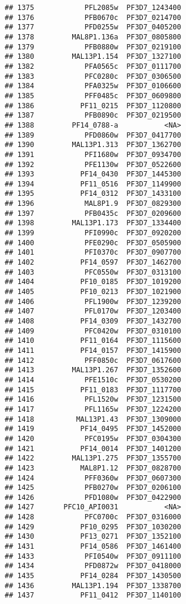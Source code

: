 \documentclass{article}\usepackage[]{graphicx}\usepackage[]{color}
\makeatletter
\newenvironment{kframe}{%
 \def\at@end@of@kframe{}%
 \ifinner\ifhmode%
  \def\at@end@of@kframe{\end{minipage}}%
  \begin{minipage}{\columnwidth}%
 \fi\fi%
 \def\FrameCommand##1{\hskip\@totalleftmargin \hskip-\fboxsep
 \colorbox{shadecolor}{##1}\hskip-\fboxsep
     \hskip-\linewidth \hskip-\@totalleftmargin \hskip\columnwidth}%
 \MakeFramed {\advance\hsize-\width
   \@totalleftmargin\z@ \linewidth\hsize
   \@setminipage}}%
 {\par\unskip\endMakeFramed%
 \at@end@of@kframe}
\newenvironment{knitrout}{}{} %
\makeatother
\begin{document}
\begin{knitrout}
\begin{kframe}
\begin{verbatim}
## 1375            PFL2085w  PF3D7_1243400
## 1376            PFB0670c  PF3D7_0214700
## 1377            PFD0255w  PF3D7_0405200
## 1378         MAL8P1.136a  PF3D7_0805800
## 1379            PFB0880w  PF3D7_0219100
## 1380         MAL13P1.154  PF3D7_1327100
## 1382            PFA0565c  PF3D7_0111700
## 1383            PFC0280c  PF3D7_0306500
## 1384            PFA0325w  PF3D7_0106600
## 1385            PFF0485c  PF3D7_0609800
## 1386           PF11_0215  PF3D7_1120800
## 1387            PFB0890c  PF3D7_0219500
## 1388         PF14_0788-a           <NA>
## 1389            PFD0860w  PF3D7_0417700
## 1390         MAL13P1.313  PF3D7_1362700
## 1391            PFI1680w  PF3D7_0934700
## 1392            PFE1130w  PF3D7_0522600
## 1393           PF14_0430  PF3D7_1445300
## 1394           PF11_0516  PF3D7_1149900
## 1395           PF14_0312  PF3D7_1433100
## 1396            MAL8P1.9  PF3D7_0829300
## 1397            PFB0435c  PF3D7_0209600
## 1398         MAL13P1.173  PF3D7_1334400
## 1399            PFI0990c  PF3D7_0920200
## 1400            PFE0290c  PF3D7_0505900
## 1401            PFI0370c  PF3D7_0907700
## 1402           PF14_0597  PF3D7_1462700
## 1403            PFC0550w  PF3D7_0313100
## 1404           PF10_0185  PF3D7_1019200
## 1405           PF10_0213  PF3D7_1021900
## 1406            PFL1900w  PF3D7_1239200
## 1407            PFL0170w  PF3D7_1203400
## 1408           PF14_0309  PF3D7_1432700
## 1409            PFC0420w  PF3D7_0310100
## 1410           PF11_0164  PF3D7_1115600
## 1411           PF14_0157  PF3D7_1415900
## 1412            PFF0850c  PF3D7_0617600
## 1413         MAL13P1.267  PF3D7_1352600
## 1414            PFE1510c  PF3D7_0530200
## 1415           PF11_0183  PF3D7_1117700
## 1416            PFL1520w  PF3D7_1231500
## 1417            PFL1165w  PF3D7_1224200
## 1418          MAL13P1.43  PF3D7_1309000
## 1419           PF14_0495  PF3D7_1452000
## 1420            PFC0195w  PF3D7_0304300
## 1421           PF14_0014  PF3D7_1401200
## 1422         MAL13P1.275  PF3D7_1355700
## 1423           MAL8P1.12  PF3D7_0828700
## 1424            PFF0360w  PF3D7_0607300
## 1425            PFB0270w  PF3D7_0206100
## 1426            PFD1080w  PF3D7_0422900
## 1427       PFC10_API0031           <NA>
## 1428            PFC0700c  PF3D7_0316000
## 1429           PF10_0295  PF3D7_1030200
## 1430           PF13_0271  PF3D7_1352100
## 1431           PF14_0586  PF3D7_1461400
## 1433            PFI0540w  PF3D7_0911100
## 1434            PFD0872w  PF3D7_0418000
## 1435           PF14_0284  PF3D7_1430500
## 1436         MAL13P1.194  PF3D7_1338700
## 1437           PF11_0412  PF3D7_1140100

\end{verbatim}
\end{kframe}
\end{knitrout}
\end{document}
